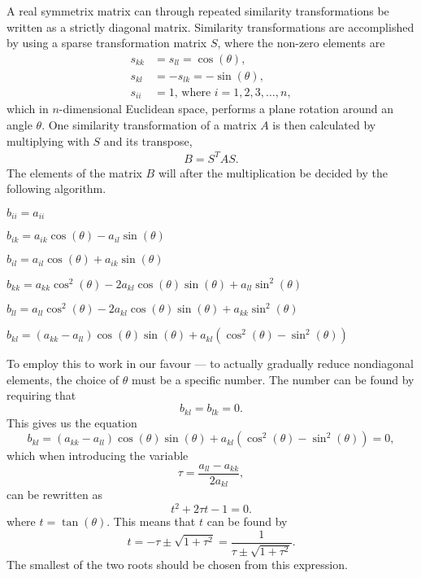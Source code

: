 A real symmetrix matrix can through repeated similarity
transformations be written as a strictly diagonal matrix.
Similarity transformations are accomplished by using a sparse
transformation matrix $S$, where the non-zero elements are
\begin{align*}
    s_{kk} &= s_{ll} = \cos{(\theta)}, \\
    s_{kl} &= -s_{lk} = -\sin{(\theta)}, \\
    s_{ii} &= 1 \text{, where } i = 1,2,3,\dots,n,
\end{align*}
which in $n$-dimensional Euclidean space, performs a plane rotation
around an angle $\theta$. One similarity transformation of a matrix
$A$ is then calculated by multiplying with $S$ and its transpose,
\begin{align*}
    B = S^T A S.
\end{align*}
The elements of the matrix $B$ will after the multiplication be
decided by the following algorithm.
\begin{algorithmic}
        \State$b_{ii} = a_{ii}$

        \State $b_{ik} = a_{ik}\cos{(\theta)} - a_{il}\sin{(\theta)}$

        \State $b_{il} = a_{il}\cos{(\theta)} + a_{ik}\sin{(\theta)}$

        \State $b_{kk} = a_{kk}\cos^2{(\theta)} -
        2a_{kl}\cos{(\theta)}\sin{(\theta)} +
        a_{ll}\sin^2{(\theta)}$

        \State $b_{ll} = a_{ll}\cos^2{(\theta)} -
        2a_{kl}\cos{(\theta)}\sin{(\theta)} +
        a_{kk}\sin^2{(\theta)}$
        
        \State $b_{kl} =
        (a_{kk}-a_{ll})\cos{(\theta)}\sin{(\theta)} +
        a_{kl}(\cos^2{(\theta)} - \sin^2{(\theta)})$
    \EndFor
\end{algorithmic}
To employ this to work in our favour --- to actually gradually
reduce nondiagonal elements, the choice of $\theta$ must be a
specific number. The number can be found by requiring that \[b_{kl}
= b_{lk} = 0.\] This gives us the equation \[b_{kl} = (a_{kk} -
a_{ll})\cos{(\theta)}\sin{(\theta)} + a_{kl}(\cos^2{(\theta)} -
\sin^2{(\theta)}) = 0,\] which when introducing the variable \[\tau
= \frac{a_{ll}-a_{kk}}{2a_{kl}},\] can be rewritten as \[t^2 +
2\tau t - 1 = 0.\] where $t = \tan{(\theta)}$. This means that
$t$ can be found by \[t = -\tau \pm \sqrt{1 + \tau^2} =
\frac{1}{\tau \pm \sqrt{1 + \tau^2}}.\] The smallest of the two
roots should be chosen from this expression.

